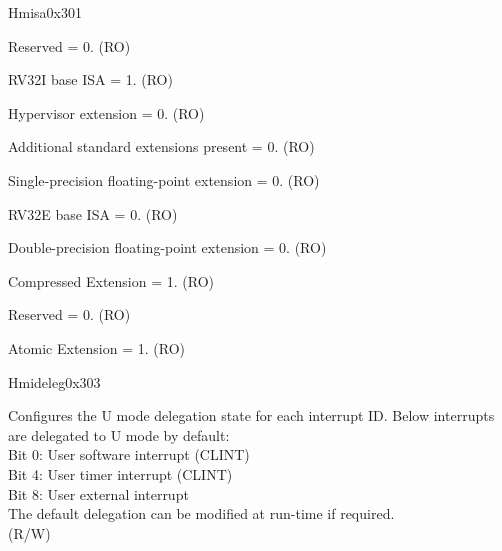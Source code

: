 \begin{register}{H}{misa}{0x301}
\begin{regdesc}
\begin{reglist}
\label{fielddesc:MISAJ}\item [J] Reserved = 0. (RO)
\label{fielddesc:MISAI}\item [I] RV32I base ISA = 1. (RO)
\label{fielddesc:MISAH}\item [H] Hypervisor extension = 0. (RO)
\label{fielddesc:MISAG}\item [G] Additional standard extensions present = 0. (RO)
\label{fielddesc:MISAF}\item [F] Single-precision floating-point extension = 0. (RO)
\label{fielddesc:MISAE}\item [E] RV32E base ISA = 0. (RO)
\label{fielddesc:MISAD}\item [D] Double-precision floating-point extension = 0. (RO)
\label{fielddesc:MISAC}\item [C] Compressed Extension = 1. (RO)
\label{fielddesc:MISAB}\item [B] Reserved = 0. (RO)
\label{fielddesc:MISAA}\item [A] Atomic Extension = 1. (RO)
\end{reglist}\end{regdesc}
\end{register}

\begin{register}{H}{mideleg}{0x303}\label{regdesc:MIDELEG}
%
\regnewline%
\begin{regdesc}\begin{reglist}
\label{fielddesc:MIDELEG}\item [MIDELEG] Configures the U mode delegation state for each interrupt ID. Below interrupts are delegated to U mode by default:\\
Bit 0: User software interrupt (CLINT)\\
Bit 4: User timer interrupt (CLINT)\\
Bit 8: User external interrupt\\
The default delegation can be modified at run-time if required.\\
(R/W)
\end{reglist}\end{regdesc}
\end{register}


